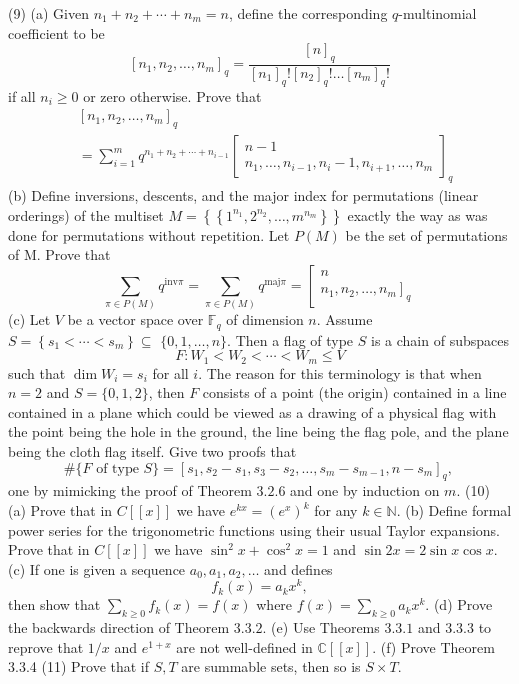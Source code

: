 \documentclass[a4paper,12pt]{ctexbook}
\begin{document}
(9) (a) Given $n_{1}+n_{2}+\cdots+n_{m}=n$, define the corresponding $q$-multinomial coefficient to be
$$
\left[n_{1}, n_{2}, \ldots, n_{m}\right]_{q}=\frac{[n]_{q}}{\left[n_{1}\right]_{q} !\left[n_{2}\right]_{q} ! \ldots\left[n_{m}\right]_{q} !}
$$
if all $n_{i} \geq 0$ or zero otherwise. Prove that
$$
\begin{aligned}
&{\left[n_{1}, n_{2}, \ldots, n_{m}\right]_{q}} \\
&=\sum_{i=1}^{m} q^{n_{1}+n_{2}+\cdots+n_{i-1}}\left[\begin{array}{c}
n-1 \\
n_{1}, \ldots, n_{i-1}, n_{i}-1, n_{i+1}, \ldots, n_{m}
\end{array}\right]_{q}
\end{aligned}
$$
(b) Define inversions, descents, and the major index for permutations (linear orderings) of the multiset $M=\left\{\left\{1^{n_{1}}, 2^{n_{2}}, \ldots, m^{n_{m}}\right\}\right\}$ exactly the way as was done for permutations without repetition. Let $P(M)$ be the set of permutations of M. Prove that
$$
\sum_{\pi \in P(M)} q^{\mathrm{inv} \pi}=\sum_{\pi \in P(M)} q^{\mathrm{maj} \pi}=\left[\begin{array}{c}
n \\
\left.n_{1}, n_{2}, \ldots, n_{m}\right]_{q}
\end{array}\right.
$$
(c) Let $V$ be a vector space over $\mathbb{F}_{q}$ of dimension $n$. Assume $S=\left\{s_{1}<\cdots<s_{m}\right\} \subseteq$ $\{0,1, \ldots, n\}$. Then a flag of type $S$ is a chain of subspaces
$$
F: W_{1}<W_{2}<\cdots<W_{m} \leq V
$$
such that $\operatorname{dim} W_{i}=s_{i}$ for all $i$. The reason for this terminology is that when $n=2$ and $S=\{0,1,2\}$, then $F$ consists of a point (the origin) contained in a line contained in a plane which could be viewed as a drawing of a physical flag with the point being the hole in the ground, the line being the flag pole, and the plane being the cloth flag itself. Give two proofs that
$$
\#\{F \text { of type } S\}=\left[s_{1}, s_{2}-s_{1}, s_{3}-s_{2}, \ldots, s_{m}-s_{m-1}, n-s_{m}\right]_{q} \text {, }
$$
one by mimicking the proof of Theorem $3.2 .6$ and one by induction on $m$.
(10) (a) Prove that in $C[[x]]$ we have $e^{k x}=\left(e^{x}\right)^{k}$ for any $k \in \mathbb{N}$.
(b) Define formal power series for the trigonometric functions using their usual Taylor expansions. Prove that in $C[[x]]$ we have $\sin ^{2} x+\cos ^{2} x=1$ and $\sin 2 x=2 \sin x \cos x$.
(c) If one is given a sequence $a_{0}, a_{1}, a_{2}, \ldots$ and defines
$$
f_{k}(x)=a_{k} x^{k},
$$
then show that $\sum_{k \geq 0} f_{k}(x)=f(x)$ where $f(x)=\sum_{k \geq 0} a_{k} x^{k}$.
(d) Prove the backwards direction of Theorem $3.3 .2$.
(e) Use Theorems $3.3 .1$ and $3.3 .3$ to reprove that $1 / x$ and $e^{1+x}$ are not well-defined in $\mathbb{C}[[x]]$.
(f) Prove Theorem 3.3.4
(11) Prove that if $S, T$ are summable sets, then so is $S \times T$.
\end{document}
